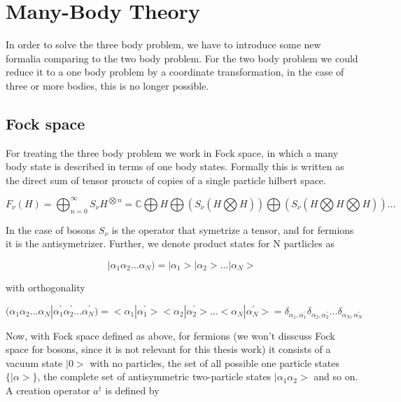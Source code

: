 \section{Many-Body Theory}
In order to solve the three body problem, we have to introduce some new formalia comparing to the two body problem. For the two body problem we could reduce it to a one body problem by a coordinate transformation, in the case of three or more bodies, this is no longer possible. 

\subsection{Fock space}
For treating the three body problem we work in Fock space, in which a many body state is described in terms of one body states. Formally this is written as the direct sum of tensor proucts of copies of a single particle hilbert space. 

\begin{equation}
F_{\nu}(H) =
\bigoplus_{n=0}^{\infty}S_{\nu}H^{\bigotimes n} =
\mathbb{C} \bigoplus H \bigoplus(S_{\nu}(H \bigotimes H)) \bigoplus (S_{\nu}(H \bigotimes H \bigotimes H)) ...
\end{equation}

In the case of bosons $S_{\nu}$ is the operator that symetrize a tensor, and for fermions it is the antisymetrizer.
Further, we denote product states for N partlicles as

\begin{equation}
|\alpha_1 \alpha_2 ... \alpha_{N}) =
|\alpha_1> |\alpha_2>...|\alpha_{N}>
\end{equation}

with orthogonality

\begin{equation}
(\alpha_1 \alpha_2 ... \alpha_N | \alpha_1^{'} \alpha_2^{'} ... \alpha_N^{'}) =
<\alpha_1| \alpha_1^{'}><\alpha_2|\alpha_2^{'}>...<\alpha_N| \alpha_N^{'}> = \delta_{\alpha_1,\alpha_1^{'}} \delta_{\alpha_2,\alpha_2^{'}}...\delta_{\alpha_N,\alpha_N^{'}}
\end{equation}

Now, with Fock space defined as above, for fermions (we won't disscuss Fock space for bosons, since it is not relevant for this thesis work) it consists of a vacuum state $|0>$ with no particles, the set of all possible one particle states $\{ |\alpha> \} $, the complete set of antisymmetric two-particle states $|\alpha_1 \alpha_2>$ and so on. A creation operator $a^{\dagger}$ is defined by

